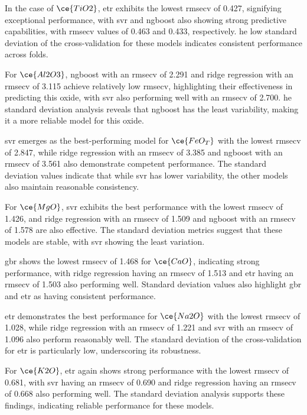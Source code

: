 In the case of $\ce{TiO2}$, \gls{etr} exhibits the lowest \gls{rmsecv} of 0.427, signifying exceptional performance, with \gls{svr} and \gls{ngboost} also showing strong predictive capabilities, with \gls{rmsecv} values of 0.463 and 0.433, respectively.
he low standard deviation of the cross-validation for these models indicates consistent performance across folds.

For $\ce{Al2O3}$, \gls{ngboost} with an \gls{rmsecv} of 2.291 and ridge regression with an \gls{rmsecv} of 3.115 achieve relatively low \gls{rmsecv}, highlighting their effectiveness in predicting this oxide, with \gls{svr} also performing well with an \gls{rmsecv} of 2.700.
he standard deviation analysis reveals that \gls{ngboost} has the least variability, making it a more reliable model for this oxide.

\gls{svr} emerges as the best-performing model for $\ce{FeO_T}$ with the lowest \gls{rmsecv} of 2.847, while ridge regression with an \gls{rmsecv} of 3.385 and \gls{ngboost} with an \gls{rmsecv} of 3.561 also demonstrate competent performance.
The standard deviation values indicate that while \gls{svr} has lower variability, the other models also maintain reasonable consistency.

For $\ce{MgO}$, \gls{svr} exhibits the best performance with the lowest \gls{rmsecv} of 1.426, and ridge regression with an \gls{rmsecv} of 1.509 and \gls{ngboost} with an \gls{rmsecv} of 1.578 are also effective.
The standard deviation metrics suggest that these models are stable, with \gls{svr} showing the least variation.

\gls{gbr} shows the lowest \gls{rmsecv} of 1.468 for $\ce{CaO}$, indicating strong performance, with ridge regression having an \gls{rmsecv} of 1.513 and \gls{etr} having an \gls{rmsecv} of 1.503 also performing well.
Standard deviation values also highlight \gls{gbr} and \gls{etr} as having consistent performance.

\gls{etr} demonstrates the best performance for $\ce{Na2O}$ with the lowest \gls{rmsecv} of 1.028, while ridge regression with an \gls{rmsecv} of 1.221 and \gls{svr} with an \gls{rmsecv} of 1.096 also perform reasonably well.
The standard deviation of the cross-validation for \gls{etr} is particularly low, underscoring its robustness.

For $\ce{K2O}$, \gls{etr} again shows strong performance with the lowest \gls{rmsecv} of 0.681, with \gls{svr} having an \gls{rmsecv} of 0.690 and ridge regression having an \gls{rmsecv} of 0.668 also performing well.
The standard deviation analysis supports these findings, indicating reliable performance for these models.

